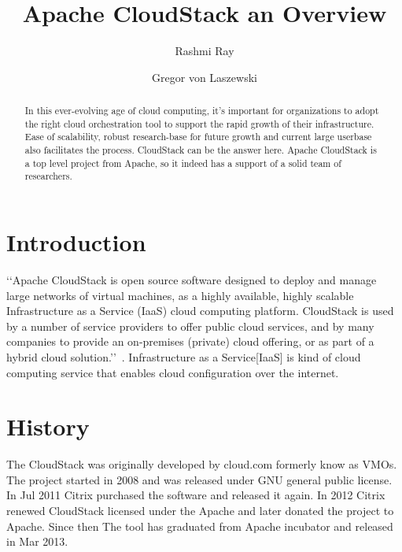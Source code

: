 
\title{Apache CloudStack an Overview}


\author{Rashmi Ray}

\author{Gregor von Laszewski}


\renewcommand{\shortauthors}{G. v. Laszewski}


\begin{abstract}
In this ever-evolving age of cloud computing, it’s important for organizations to adopt the right
cloud orchestration tool to support the rapid growth of their infrastructure. Ease of scalability, robust research-base
for future growth and current large userbase also facilitates the process. CloudStack can be the 
answer here. Apache CloudStack is a top level project from Apache, so it indeed has a support of a solid team of researchers.

\end{abstract}


\maketitle

\section{Introduction}
‘‘Apache CloudStack is open source software designed to deploy and manage large networks of 
virtual machines, as a highly available, highly scalable Infrastructure as a Service (IaaS)
cloud computing platform. CloudStack is used by a number of service providers to offer public 
cloud services, and by many companies to provide an on-premises (private) cloud offering, 
or as part of a hybrid cloud solution.’’~\cite{hid-sp18-417-www-cloudstack-intro}. 
Infrastructure as a Service[IaaS] is kind of cloud computing service that enables cloud 
configuration over the internet. 


\section{History}
The CloudStack was originally developed by cloud.com formerly know as VMOs. 
The project started in 2008 and was released under GNU general public license. 
In Jul 2011 Citrix purchased the software and released it again. In 2012 Citrix 
renewed CloudStack licensed under the Apache and later donated the project to Apache.
Since then The tool has graduated from Apache incubator and released in Mar 2013. 

